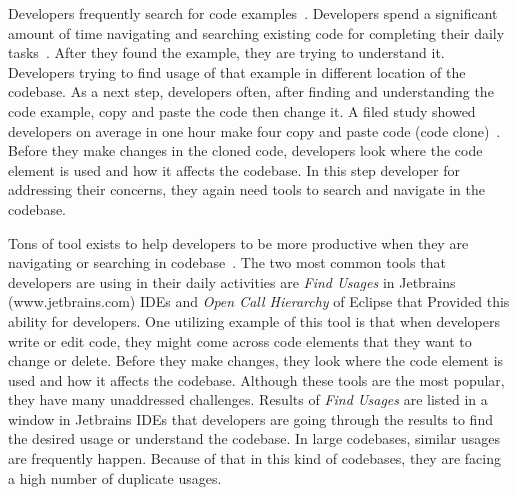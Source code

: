 \documentclass[conference]{IEEEtran}
\begin{document}
Developers frequently search for code examples~\cite{brandt2009two,sadowski2015developers}. Developers spend a significant amount of time navigating and searching existing code for completing their daily tasks~\cite{piorkowski2016foraging,ko2006exploratory}. After they found the example, they are trying to understand it. Developers trying to find usage of that example in different location of the codebase. As a next step, developers often, after finding and understanding the code example, copy and paste the code then change it. A filed study showed developers on average in one hour make four copy and paste code (code clone)~\cite{kim2004ethnographic}. Before they make changes in the cloned code, developers look where the code element is used and how it affects the codebase. In this step developer for addressing their concerns, they again need tools to search and navigate in the codebase.\par


Tons of tool exists to help developers to be more productive when they are navigating or searching in codebase~\cite{augustine2015field,ko2006exploratory,albusays2017interviews}. The two most common tools that developers are using in their daily activities are \textit{Find Usages} in Jetbrains (www.jetbrains.com) IDEs and \textit{Open Call Hierarchy} of Eclipse that Provided this ability for developers. One utilizing example of this tool is that when developers write or edit code, they might come across code elements that they want to change or delete. Before they make changes, they look where the code element is used and how it affects the codebase. Although these tools are the most popular, they have many unaddressed challenges. Results of \textit{Find Usages} are listed in a window in Jetbrains IDEs that developers are going through the results to find the desired usage or understand the codebase. In large codebases, similar usages are frequently happen. Because of that in this kind of codebases, they are facing a high number of duplicate usages.\par

\end{document}
